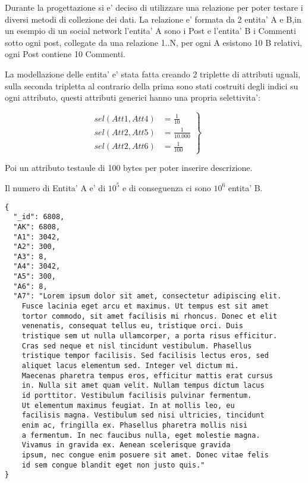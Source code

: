 Durante la progettazione si e' deciso di utilizzare una relazione per poter testare i diversi metodi di collezione dei dati.
La relazione e' formata da 2 entita' A e B,in un esempio di un social network l'entita' A sono i Post e l'entita' B i Commenti sotto ogni post, collegate da una relazione 1..N,
per ogni A esistono 10 B relativi, ogni Post contiene 10 Commenti.

La modellazione delle entita' e' stata fatta creando 2 triplette di attributi uguali, sulla seconda tripletta al contrario della prima sono stati costruiti degli indici su ogni attributo,
questi attributi generici hanno una propria selettivita':

    \begin{equation*}
        \left.\begin{aligned}
         sel(Att1, Att4) &= \frac{1}{10}    \\
         sel(Att2, Att5) &= \frac{1}{10.000} \\
         sel(Att2, Att6) &= \frac{1}{100}
        \end{aligned}
        \right\}
        \qquad 
        \end{equation*}

Poi un attributo testaule di 100 bytes per poter inserire descrizione.

Il numero di Entita' A e' di $10^5$ e di conseguenza ci sono $10^6$ entita' B.


\begin{Verbatim}[frame=single,framesep=2mm,label=A (POST),labelposition=all]
{
  "_id": 6808,
  "AK": 6808,
  "A1": 3042,
  "A2": 300,
  "A3": 8,
  "A4": 3042,
  "A5": 300,
  "A6": 8,
  "A7": "Lorem ipsum dolor sit amet, consectetur adipiscing elit. 
    Fusce lacinia eget arcu et maximus. Ut tempus est sit amet 
    tortor commodo, sit amet facilisis mi rhoncus. Donec et elit
    venenatis, consequat tellus eu, tristique orci. Duis 
    tristique sem ut nulla ullamcorper, a porta risus efficitur.
    Cras sed neque et nisl tincidunt vestibulum. Phasellus 
    tristique tempor facilisis. Sed facilisis lectus eros, sed 
    aliquet lacus elementum sed. Integer vel dictum mi. 
    Maecenas pharetra tempus eros, efficitur mattis erat cursus
    in. Nulla sit amet quam velit. Nullam tempus dictum lacus
    id porttitor. Vestibulum facilisis pulvinar fermentum.
    Ut elementum maximus feugiat. In at mollis leo, eu 
    facilisis magna. Vestibulum sed nisi ultricies, tincidunt
    enim ac, fringilla ex. Phasellus pharetra mollis nisi
    a fermentum. In nec faucibus nulla, eget molestie magna.
    Vivamus in gravida ex. Aenean scelerisque gravida 
    ipsum, nec congue enim posuere sit amet. Donec vitae felis
    id sem congue blandit eget non justo quis."
}
\end{Verbatim}

